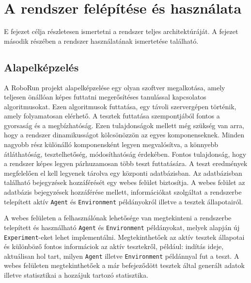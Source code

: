 \chapter{A rendszer felépítése és használata}\label{ch:Felepites}

\begin{osszefoglal}
	E fejezet célja részletesen ismertetni a rendszer teljes architektúráját. A fejezet második részében a rendszer használatának ismertetése található. 
\end{osszefoglal}


\section{Alapelképzelés}\label{sec:Alapelkepzels}

A RoboRun projekt alapelképzelése egy olyan szoftver megalkotása, amely teljesen önállóan képes futtatni megerősítéses tanulással kapcsolatos algoritmusokat. Ezen algoritmusok futtatása, egy távoli szervergépen történik, amely folyamatosan elérhető. A tesztek futtatása szempontjából fontos a gyorsaság és a megbízhatóság. Ezen tulajdonságok mellett még szükség van arra, hogy a rendszer dinamikusságot kölcsönözzön az egyes komponenseknek. Minden nagyobb rész különálló komponensként legyen megvalósítva, a könnyebb átláthatóság, tesztelhetőség, módosíthatóság érdekében. Fontos tulajdonság, hogy a rendszer képes legyen párhuzamosan több teszt futtatására. A teszt eredmények megfelelően el kell legyenek tárolva egy központi adatbázisban. Az adatbázisban található bejegyzések hozzáférését egy webes felület biztosítja. A webes felület az adatbázis bejegyzések hozzáférése mellett, információkat szolgáltat a rendszerbe telepített aktív \texttt{Agent} és \texttt{Environment} példányokról illetve a tesztek állapotairól.

A webes felületen a felhasználónak lehetősége van megtekinteni a rendszerbe telepített és használható \texttt{Agent} és \texttt{Environment} példányokat, melyek alapján új \texttt{Experiment}-eket lehet implementálni. Megtekinthetőek az aktív tesztek állapotai és különböző fontos informáciok az aktív tesztekről, például: indítás ideje, aktuálisan hol tart, milyen \texttt{Agent} illetve \texttt{Environment} példánnyal fut a teszt. A webes felületen megtekinthetőek a már befejeződött tesztek által generált adatok illetve statisztikai a hozzájuk tartozó statisztika. 

